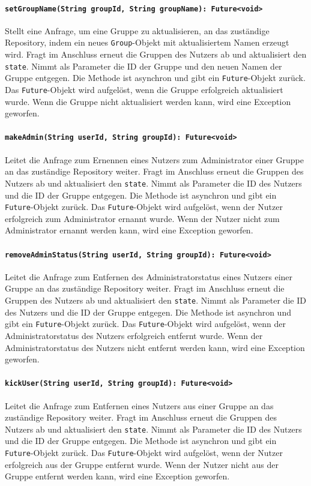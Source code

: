 \documentclass{entwurfsheft}
\begin{document}
\paragraph{\texttt{setGroupName(String groupId, String groupName): Future<void>}}
Stellt eine Anfrage, um eine Gruppe zu aktualisieren, an das zuständige Repository, indem ein neues \texttt{Group}-Objekt mit aktualisiertem Namen erzeugt wird. Fragt im Anschluss erneut die Gruppen des Nutzers ab und aktualisiert den \texttt{state}. Nimmt als Parameter die ID der Gruppe und den neuen Namen der Gruppe entgegen. Die Methode ist asynchron und gibt ein \texttt{Future}-Objekt zurück. Das \texttt{Future}-Objekt wird aufgelöst, wenn die Gruppe erfolgreich aktualisiert wurde. Wenn die Gruppe nicht aktualisiert werden kann, wird eine Exception geworfen.
\paragraph{\texttt{makeAdmin(String userId, String groupId): Future<void>}}
Leitet die Anfrage zum Ernennen eines Nutzers zum Administrator einer Gruppe an das zuständige Repository weiter. Fragt im Anschluss erneut die Gruppen des Nutzers ab und aktualisiert den \texttt{state}. Nimmt als Parameter die ID des Nutzers und die ID der Gruppe entgegen. Die Methode ist asynchron und gibt ein \texttt{Future}-Objekt zurück. Das \texttt{Future}-Objekt wird aufgelöst, wenn der Nutzer erfolgreich zum Administrator ernannt wurde. Wenn der Nutzer nicht zum Administrator ernannt werden kann, wird eine Exception geworfen.
\paragraph{\texttt{removeAdminStatus(String userId, String groupId): Future<void>}}
Leitet die Anfrage zum Entfernen des Administratorstatus eines Nutzers einer Gruppe an das zuständige Repository weiter. Fragt im Anschluss erneut die Gruppen des Nutzers ab und aktualisiert den \texttt{state}. Nimmt als Parameter die ID des Nutzers und die ID der Gruppe entgegen. Die Methode ist asynchron und gibt ein \texttt{Future}-Objekt zurück. Das \texttt{Future}-Objekt wird aufgelöst, wenn der Administratorstatus des Nutzers erfolgreich entfernt wurde. Wenn der Administratorstatus des Nutzers nicht entfernt werden kann, wird eine Exception geworfen.
\paragraph{\texttt{kickUser(String userId, String groupId): Future<void>}}
Leitet die Anfrage zum Entfernen eines Nutzers aus einer Gruppe an das zuständige Repository weiter. Fragt im Anschluss erneut die Gruppen des Nutzers ab und aktualisiert den \texttt{state}. Nimmt als Parameter die ID des Nutzers und die ID der Gruppe entgegen. Die Methode ist asynchron und gibt ein \texttt{Future}-Objekt zurück. Das \texttt{Future}-Objekt wird aufgelöst, wenn der Nutzer erfolgreich aus der Gruppe entfernt wurde. Wenn der Nutzer nicht aus der Gruppe entfernt werden kann, wird eine Exception geworfen.
\end{document}
